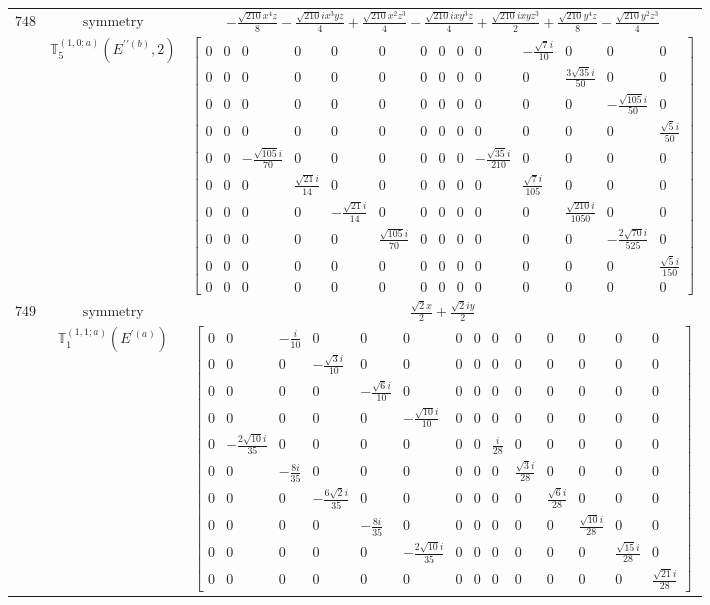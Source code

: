 \documentclass[fleqn,8pt,landscape]{jsarticle}
\begin{document}
\begin{longtable}{ccc}
$ 748 $ & $ \text{symmetry} $ & $ - \frac{\sqrt{210} x^{4} z}{8} - \frac{\sqrt{210} i x^{3} y z}{4} + \frac{\sqrt{210} x^{2} z^{3}}{4} - \frac{\sqrt{210} i x y^{3} z}{4} + \frac{\sqrt{210} i x y z^{3}}{2} + \frac{\sqrt{210} y^{4} z}{8} - \frac{\sqrt{210} y^{2} z^{3}}{4} $ \\
$  $ & $ \mathbb{T}_{5}^{(1,0;a)}(E^{\prime\prime(b)},2) $ & $ \begin{bmatrix} 0 & 0 & 0 & 0 & 0 & 0 & 0 & 0 & 0 & 0 & - \frac{\sqrt{7} i}{10} & 0 & 0 & 0 \\ 0 & 0 & 0 & 0 & 0 & 0 & 0 & 0 & 0 & 0 & 0 & \frac{3 \sqrt{35} i}{50} & 0 & 0 \\ 0 & 0 & 0 & 0 & 0 & 0 & 0 & 0 & 0 & 0 & 0 & 0 & - \frac{\sqrt{105} i}{50} & 0 \\ 0 & 0 & 0 & 0 & 0 & 0 & 0 & 0 & 0 & 0 & 0 & 0 & 0 & \frac{\sqrt{5} i}{50} \\ 0 & 0 & - \frac{\sqrt{105} i}{70} & 0 & 0 & 0 & 0 & 0 & 0 & - \frac{\sqrt{35} i}{210} & 0 & 0 & 0 & 0 \\ 0 & 0 & 0 & \frac{\sqrt{21} i}{14} & 0 & 0 & 0 & 0 & 0 & 0 & \frac{\sqrt{7} i}{105} & 0 & 0 & 0 \\ 0 & 0 & 0 & 0 & - \frac{\sqrt{21} i}{14} & 0 & 0 & 0 & 0 & 0 & 0 & \frac{\sqrt{210} i}{1050} & 0 & 0 \\ 0 & 0 & 0 & 0 & 0 & \frac{\sqrt{105} i}{70} & 0 & 0 & 0 & 0 & 0 & 0 & - \frac{2 \sqrt{70} i}{525} & 0 \\ 0 & 0 & 0 & 0 & 0 & 0 & 0 & 0 & 0 & 0 & 0 & 0 & 0 & \frac{\sqrt{5} i}{150} \\ 0 & 0 & 0 & 0 & 0 & 0 & 0 & 0 & 0 & 0 & 0 & 0 & 0 & 0 \end{bmatrix} $ \\ \hline
$ 749 $ & $ \text{symmetry} $ & $ \frac{\sqrt{2} x}{2} + \frac{\sqrt{2} i y}{2} $ \\
$  $ & $ \mathbb{T}_{1}^{(1,1;a)}(E^{\prime(a)}) $ & $ \begin{bmatrix} 0 & 0 & - \frac{i}{10} & 0 & 0 & 0 & 0 & 0 & 0 & 0 & 0 & 0 & 0 & 0 \\ 0 & 0 & 0 & - \frac{\sqrt{3} i}{10} & 0 & 0 & 0 & 0 & 0 & 0 & 0 & 0 & 0 & 0 \\ 0 & 0 & 0 & 0 & - \frac{\sqrt{6} i}{10} & 0 & 0 & 0 & 0 & 0 & 0 & 0 & 0 & 0 \\ 0 & 0 & 0 & 0 & 0 & - \frac{\sqrt{10} i}{10} & 0 & 0 & 0 & 0 & 0 & 0 & 0 & 0 \\ 0 & - \frac{2 \sqrt{10} i}{35} & 0 & 0 & 0 & 0 & 0 & 0 & \frac{i}{28} & 0 & 0 & 0 & 0 & 0 \\ 0 & 0 & - \frac{8 i}{35} & 0 & 0 & 0 & 0 & 0 & 0 & \frac{\sqrt{3} i}{28} & 0 & 0 & 0 & 0 \\ 0 & 0 & 0 & - \frac{6 \sqrt{2} i}{35} & 0 & 0 & 0 & 0 & 0 & 0 & \frac{\sqrt{6} i}{28} & 0 & 0 & 0 \\ 0 & 0 & 0 & 0 & - \frac{8 i}{35} & 0 & 0 & 0 & 0 & 0 & 0 & \frac{\sqrt{10} i}{28} & 0 & 0 \\ 0 & 0 & 0 & 0 & 0 & - \frac{2 \sqrt{10} i}{35} & 0 & 0 & 0 & 0 & 0 & 0 & \frac{\sqrt{15} i}{28} & 0 \\ 0 & 0 & 0 & 0 & 0 & 0 & 0 & 0 & 0 & 0 & 0 & 0 & 0 & \frac{\sqrt{21} i}{28} \end{bmatrix} $ \\ \hline

\end{longtable}
\end{document}
